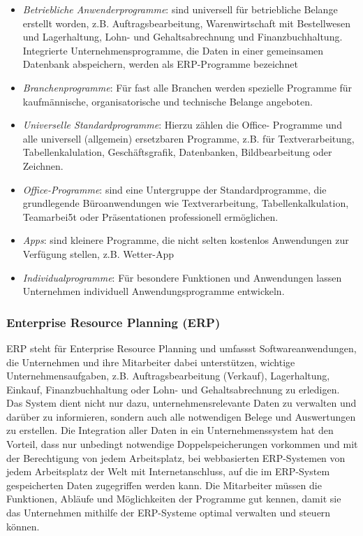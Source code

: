 \documentclass[a4paper, 12pt]{report}
\begin{document}
\begin{itemize}
    \item \emph{Betriebliche Anwenderprogramme}: sind universell für 
        betriebliche Belange erstellt worden, z.B. Auftragsbearbeitung, 
        Warenwirtschaft mit Bestellwesen und Lagerhaltung, Lohn- und 
        Gehaltsabrechnung und Finanzbuchhaltung. Integrierte 
        Unternehmensprogramme, die Daten in einer gemeinsamen Datenbank 
        abspeichern, werden als ERP-Programme bezeichnet
    \item \emph{Branchenprogramme}: Für fast alle Branchen werden spezielle 
        Programme für kaufmännische, organisatorische und technische Belange
        angeboten. 
    \item \emph{Universelle Standardprogramme}: Hierzu zählen die Office-
        Programme und alle universell (allgemein) ersetzbaren Programme, z.B. 
        für Textverarbeitung, Tabellenkalulation, Geschäftsgrafik, Datenbanken, 
        Bildbearbeitung oder Zeichnen. 
    \item \emph{Office-Programme}: sind eine Untergruppe der Standardprogramme, 
        die grundlegende Büroanwendungen wie Textverarbeitung, 
        Tabellenkalkulation, Teamarbei5t oder Präsentationen professionell 
        ermöglichen. 
    \item \emph{Apps}: sind kleinere Programme, die nicht selten kostenlos 
        Anwendungen zur Verfügung stellen, z.B. Wetter-App
    \item \emph{Individualprogramme}: Für besondere Funktionen und Anwendungen 
        lassen Unternehmen individuell Anwendungsprogramme entwickeln. 
\end{itemize}

\subsubsection{Enterprise Resource Planning (ERP)}

ERP steht für Enterprise Resource Planning und umfassst Softwareanwendungen, die 
Unternehmen und ihre Mitarbeiter dabei unterstützen, wichtige 
Unternehmensaufgaben, z.B. Auftragsbearbeitung (Verkauf), Lagerhaltung, Einkauf, 
Finanzbuchhaltung oder Lohn- und Gehaltsabrechnung zu erledigen. Das System 
dient nicht nur dazu, unternehmensrelevante Daten zu verwalten und darüber zu 
informieren, sondern auch alle notwendigen Belege und Auswertungen zu erstellen. 
Die Integration aller Daten in ein Unternehmenssystem hat den Vorteil, dass nur 
unbedingt notwendige Doppelspeicherungen vorkommen und mit der Berechtigung von 
jedem Arbeitsplatz, bei webbasierten ERP-Systemen von jedem Arbeitsplatz der 
Welt mit Internetanschluss, auf die im ERP-System gespeicherten Daten 
zugegriffen werden kann. Die Mitarbeiter müssen die Funktionen, Abläufe und 
Möglichkeiten der Programme gut kennen, damit sie das Unternehmen mithilfe der
ERP-Systeme optimal verwalten und steuern können. \\
\end{document}
